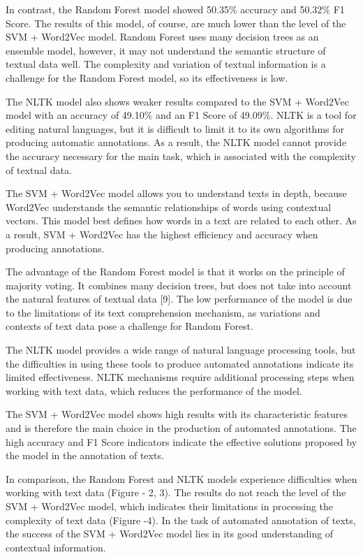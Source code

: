In contrast, the Random Forest model showed 50.35\% accuracy and 50.32\%
F1 Score. The results of this model, of course, are much lower than the
level of the SVM + Word2Vec model. Random Forest uses many decision
trees as an ensemble model, however, it may not understand the semantic
structure of textual data well. The complexity and variation of textual
information is a challenge for the Random Forest model, so its
effectiveness is low.

The NLTK model also shows weaker results compared to the SVM + Word2Vec
model with an accuracy of 49.10\% and an F1 Score of 49.09\%. NLTK is a
tool for editing natural languages, but it is difficult to limit it to
its own algorithms for producing automatic annotations. As a result, the
NLTK model cannot provide the accuracy necessary for the main task,
which is associated with the complexity of textual data.

The SVM + Word2Vec model allows you to understand texts in depth,
because Word2Vec understands the semantic relationships of words using
contextual vectors. This model best defines how words in a text are
related to each other. As a result, SVM + Word2Vec has the highest
efficiency and accuracy when producing annotations.

The advantage of the Random Forest model is that it works on the
principle of majority voting. It combines many decision trees, but does
not take into account the natural features of textual data {[}9{]}. The
low performance of the model is due to the limitations of its text
comprehension mechanism, as variations and contexts of text data pose a
challenge for Random Forest.

The NLTK model provides a wide range of natural language processing
tools, but the difficulties in using these tools to produce automated
annotations indicate its limited effectiveness. NLTK mechanisms require
additional processing steps when working with text data, which reduces
the performance of the model.

The SVM + Word2Vec model shows high results with its characteristic
features and is therefore the main choice in the production of automated
annotations. The high accuracy and F1 Score indicators indicate the
effective solutions proposed by the model in the annotation of texts.

In comparison, the Random Forest and NLTK models experience difficulties
when working with text data (Figure - 2, 3). The results do not reach
the level of the SVM + Word2Vec model, which indicates their limitations
in processing the complexity of text data (Figure -4). In the task of
automated annotation of texts, the success of the SVM + Word2Vec model
lies in its good understanding of contextual information.


